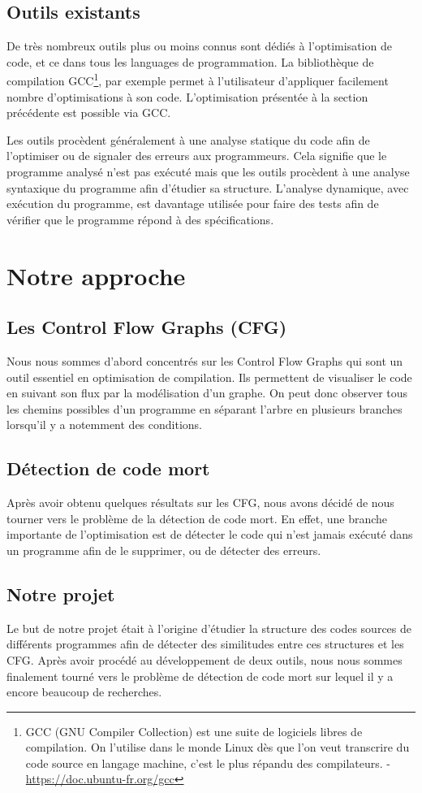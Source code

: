 \subsection{Outils existants}
De très nombreux outils plus ou moins connus sont dédiés à l'optimisation de code, et ce dans tous les languages de programmation. La bibliothèque de compilation GCC\footnote{GCC (GNU Compiler Collection) est une suite de logiciels libres de compilation. On l'utilise dans le monde Linux dès que l'on veut transcrire du code source en langage machine, c'est le plus répandu des compilateurs. - \url{https://doc.ubuntu-fr.org/gcc}}, par exemple permet à l'utilisateur d'appliquer facilement nombre d'optimisations à son code. L'optimisation présentée à la section précédente est possible via GCC.

Les outils procèdent généralement à une analyse statique du code afin de l'optimiser ou de signaler des erreurs aux programmeurs. Cela signifie que le programme analysé n'est pas exécuté mais que les outils procèdent à une analyse syntaxique du programme afin d'étudier sa structure. L'analyse dynamique, avec exécution du programme, est davantage utilisée pour faire des tests afin de vérifier que le programme répond à des spécifications.  


\section{Notre approche}
\subsection{Les Control Flow Graphs (CFG)}
Nous nous sommes d'abord concentrés sur les Control Flow Graphs qui sont un outil essentiel en optimisation de compilation. Ils permettent de visualiser le code en suivant son flux par la modélisation d'un graphe. On peut donc observer tous les chemins possibles d'un programme en séparant l'arbre en plusieurs branches lorsqu'il y a notemment des conditions.
\subsection{Détection de code mort}
Après avoir obtenu quelques résultats sur les CFG, nous avons décidé de nous tourner vers le problème de la détection de code mort. En effet, une branche importante de l'optimisation est de détecter le code qui n'est jamais exécuté dans un programme afin de le supprimer, ou de détecter des erreurs.
\subsection{Notre projet}
Le but de notre projet était à l'origine d'étudier la structure des codes sources de différents programmes afin de détecter des similitudes entre ces structures et les CFG. Après avoir procédé au développement de deux outils, nous nous sommes finalement tourné vers le problème de détection de code mort sur lequel il y a encore beaucoup de recherches.